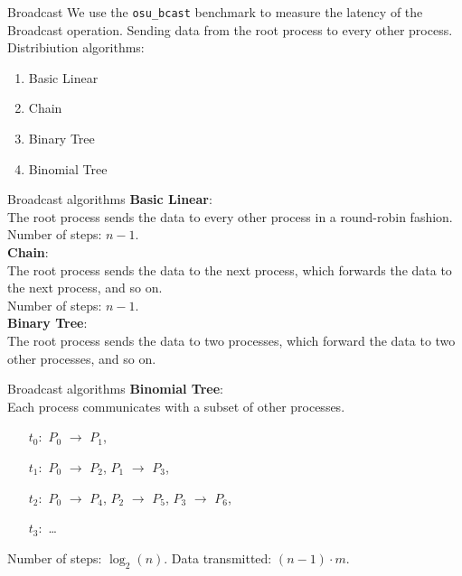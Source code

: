 %
%
\begin{frame}[fragile]{Broadcast}
    We use the \texttt{osu\_bcast} benchmark to measure the latency
    of the Broadcast operation. Sending data from the root process
    to every other process. \\
    Distribiution algorithms:
    \begin{enumerate}
        \item Basic Linear
        \item Chain
        \item Binary Tree
        \item Binomial Tree
    \end{enumerate}
\end{frame}
\begin{frame}[fragile]{Broadcast algorithms}
    \textbf{Basic Linear}: \\
    The root process sends the data to every other process in 
    a round-robin fashion. \\
    Number of steps: $n-1$. \\
    \vspace*{.25cm}
    \textbf{Chain}: \\
    The root process sends the data to the next process, which forwards
    the data to the next process, and so on. \\
    Number of steps: $n-1$. \\
    \vspace*{.25cm}
    \textbf{Binary Tree}: \\
    The root process sends the data to two processes, which forward
    the data to two other processes, and so on. \\
\end{frame}
\begin{frame}[fragile]{Broadcast algorithms}
    \textbf{Binomial Tree}: \\
    Each process communicates with a subset of other processes.
    \begin{enumerate}
        \item[$t_0:$] $P_0$ $\rightarrow$ $P_1$,
        \item[$t_1:$] $P_0$ $\rightarrow$ $P_2$, $P_1$ $\rightarrow$ $P_3$,
        \item[$t_2:$] $P_0$ $\rightarrow$ $P_4$, $P_2$ $\rightarrow$ $P_5$, $P_3$ $\rightarrow$ $P_6$,
        \item[$t_3:$] \dots
    \end{enumerate}
    Number of steps: $\log_2(n)$. Data transmitted: $(n-1) \cdot m$.
\end{frame}
